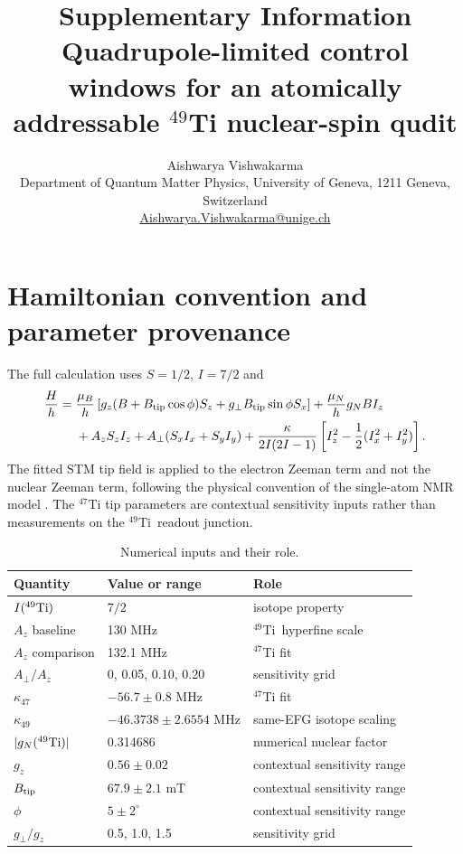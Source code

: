 \documentclass[11pt]{article}
\title{Supplementary Information\\Quadrupole-limited control windows for an atomically addressable $^{49}$Ti nuclear-spin qudit}
\author{Aishwarya Vishwakarma\\Department of Quantum Matter Physics, University of Geneva, 1211 Geneva, Switzerland\\\href{mailto:Aishwarya.Vishwakarma@unige.ch}{Aishwarya.Vishwakarma@unige.ch}}
\date{}
\newcommand{\Ti}{$^{49}$Ti}
\begin{document}
\maketitle

\section{Hamiltonian convention and parameter provenance}
The full calculation uses $S=1/2$, $I=7/2$ and
\begin{align}
\frac{H}{h}={}&\frac{\mu_B}{h}\left[g_z(B+B_{\rm tip}\cos\phi)S_z+g_\perp B_{\rm tip}\sin\phi S_x\right]+\frac{\mu_N}{h}g_NBI_z\\
&+A_zS_zI_z+A_\perp(S_xI_x+S_yI_y)+\frac{\kappa}{2I(2I-1)}\left[I_z^2-\frac{1}{2}(I_x^2+I_y^2)\right].
\end{align}
The fitted STM tip field is applied to the electron Zeeman term and not the nuclear Zeeman term, following the physical convention of the single-atom NMR model \cite{vennema2025}. The $^{47}$Ti tip parameters are contextual sensitivity inputs rather than measurements on the \Ti\ readout junction.

\begin{table}[h]
\centering
\caption{Numerical inputs and their role.}
\begin{tabular}{lll}
\toprule
Quantity & Value or range & Role\\
\midrule
$I(^{49}{\rm Ti})$ & $7/2$ & isotope property\\
$A_z$ baseline & 130 MHz & \Ti\ hyperfine scale \cite{stolte2025}\\
$A_z$ comparison & 132.1 MHz & $^{47}$Ti fit \cite{vennema2025}\\
$A_\perp/A_z$ & 0, 0.05, 0.10, 0.20 & sensitivity grid\\
$\kappa_{47}$ & $-56.7\pm0.8$ MHz & $^{47}$Ti fit \cite{vennema2025}\\
$\kappa_{49}$ & $-46.3738\pm2.6554$ MHz & same-EFG isotope scaling\\
$|g_N(^{49}{\rm Ti})|$ & 0.314686 & numerical nuclear factor\\
$g_z$ & $0.56\pm0.02$ & contextual sensitivity range\\
$B_{\rm tip}$ & $67.9\pm2.1$ mT & contextual sensitivity range\\
$\phi$ & $5\pm2^\circ$ & contextual sensitivity range\\
$g_\perp/g_z$ & 0.5, 1.0, 1.5 & sensitivity grid\\
\bottomrule
\end{tabular}
\end{table}
\end{document}
